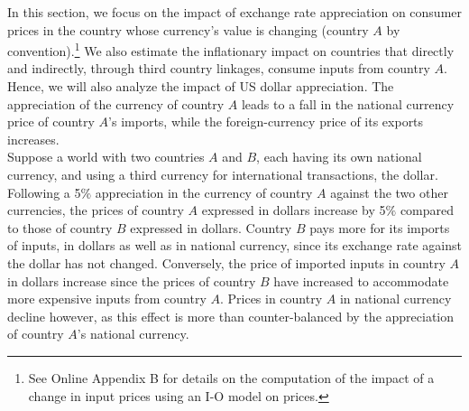 \documentclass[11pt,a4paper]{paper} %
\begin{document}
In this section, we focus on the impact of exchange rate appreciation on consumer prices in the country whose currency’s value is changing (country $A$ by convention).\footnote{See Online Appendix B for details on the computation of the impact of a change in input prices using an I-O model on prices.}
We also estimate the inflationary impact on countries that directly and indirectly, through third country linkages, consume inputs from country $A$. Hence, we will also analyze the impact of US dollar appreciation.
The appreciation of the currency of country $A$ leads to a fall in the national currency price of country $A$'s imports, while the foreign-currency price of its exports increases. \\
Suppose a world with two countries $A$ and $B$, each having its own national currency, and using a third currency for international transactions, the dollar.
Following a 5$\%$ appreciation in the currency of country $A$ against the two other currencies, the prices of country $A$ expressed in dollars increase by 5$\%$ compared to those of country $B$ expressed in dollars. 
Country $B$ pays more for its imports of inputs, in dollars as well as in national currency, since its exchange rate against the dollar has not changed. 
Conversely, the price of imported inputs in country $A$ in dollars increase since the prices of country $B$ have increased to accommodate more expensive inputs from country $A$. Prices in country $A$ in national currency decline however, as this effect is more than counter-balanced by the appreciation of country $A$'s national currency.
\end{document}

